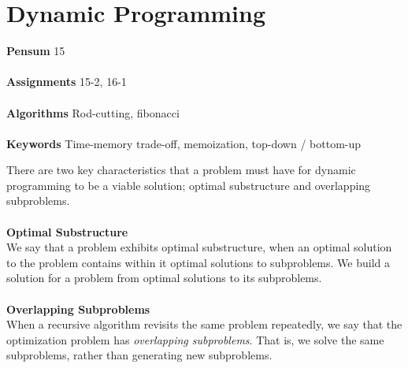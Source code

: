 
\chapter{Dynamic Programming}
\label{ch:dynamicprogramming}

\textbf{Pensum} 15 \cite{clrs} \\\\
\textbf{Assignments} 15-2, 16-1 \\\\
\textbf{Algorithms} Rod-cutting, fibonacci \\\\
\textbf{Keywords} Time-memory trade-off, memoization, top-down / bottom-up
\vspace{1in}

\noindent There are two key characteristics that a problem must have for
dynamic programming to be a viable solution; optimal substructure and
overlapping subproblems.
\\\\
\noindent \textbf{Optimal Substructure}\\
We say that a problem exhibits optimal substructure, when an optimal solution
to the problem contains within it optimal solutions to subproblems. We build
a solution for a problem from optimal solutions to its subproblems.
\\\\
\noindent \textbf{Overlapping Subproblems}\\
When a recursive algorithm revisits the same problem repeatedly, we say that
the optimization problem has \textit{overlapping subproblems}. That is, we
solve the same subproblems, rather than generating new subproblems. %

\newpage

